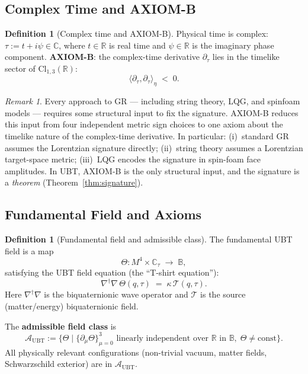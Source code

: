 \documentclass[12pt,a4paper]{article}
\theoremstyle{definition}
\newtheorem{definition}[theorem]{Definition}
\theoremstyle{remark}
\newtheorem{remark}[theorem]{Remark}
\newcommand{\BB}{\mathbb{B}}
\newcommand{\CC}{\mathbb{C}}
\newcommand{\RR}{\mathbb{R}}
\newcommand{\calA}{\mathcal{A}}
\newcommand{\calT}{\mathcal{T}}
\begin{document}
\subsection{Complex Time and AXIOM-B}

\begin{definition}[Complex time and AXIOM-B]
\label{def:axiomb}
Physical time is complex: $\tau := t + i\psi \in \CC$,
where $t \in \RR$ is real time and $\psi \in \RR$ is the imaginary phase component.
\textbf{AXIOM-B}: the complex-time derivative $\partial_\tau$ lies in the
timelike sector of $\mathrm{Cl}_{1,3}(\RR)$:
\[
  \langle\partial_\tau,\partial_\tau\rangle_\eta \;<\; 0.
\]
\end{definition}

\begin{remark}
Every approach to GR — including string theory, LQG, and spinfoam models —
requires some structural input to fix the signature.
AXIOM-B reduces this input from four independent metric sign choices to one
axiom about the timelike nature of the complex-time derivative.
In particular:
(i)~standard GR assumes the Lorentzian signature directly;
(ii)~string theory assumes a Lorentzian target-space metric;
(iii)~LQG encodes the signature in spin-foam face amplitudes.
In UBT, AXIOM-B is the only structural input, and the signature is a
\emph{theorem} (Theorem~\ref{thm:signature}).
\end{remark}

\subsection{Fundamental Field and Axioms}

\begin{definition}[Fundamental field and admissible class]
\label{def:theta}
The fundamental UBT field is a map
\[
  \Theta : M^4 \times \CC_\tau \;\longrightarrow\; \BB,
\]
satisfying the UBT field equation (the ``T-shirt equation''):
\[
  \nabla^\dagger\nabla\,\Theta(q,\tau) \;=\; \kappa\,\calT(q,\tau).
\]
Here $\nabla^\dagger\nabla$ is the biquaternionic wave operator and
$\calT$ is the source (matter/energy) biquaternionic field.

The \textbf{admissible field class} is
\[
  \calA_{\mathrm{UBT}} :=
  \bigl\{\Theta \;\big|\; \{\partial_\mu\Theta\}_{\mu=0}^3
  \text{ linearly independent over } \RR \text{ in } \BB,\;
  \Theta \neq \mathrm{const}\bigr\}.
\]
All physically relevant configurations (non-trivial vacuum, matter fields,
Schwarzschild exterior) are in $\calA_{\mathrm{UBT}}$.
\end{definition}
\end{document}
